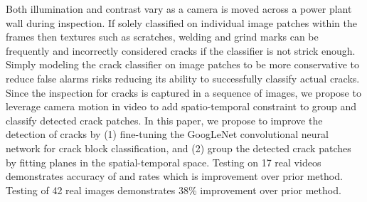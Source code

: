         Both illumination and contrast vary as a camera is moved across a power plant wall during inspection. If solely classified on individual image patches within the frames then textures such as scratches, welding and grind marks can be frequently and incorrectly considered cracks if the classifier is not strick enough.
        Simply modeling the crack classifier on image patches to be more conservative to reduce false alarms risks reducing its ability to successfully classify actual cracks. 
        Since the inspection for cracks is captured in a sequence of images, we propose to leverage camera motion in video to add spatio-temporal constraint to group and classify detected crack patches. 
        In this paper, we propose to improve the detection of cracks by (1) fine-tuning the GoogLeNet convolutional neural network for crack block classification, and (2) group the detected crack patches by fitting planes in the spatial-temporal space.
        Testing on 17 real videos demonstrates accuracy of  and  rates which is \comment{[XX]\%} improvement over prior method. Testing of 42 real images demonstrates 38\% improvement over prior method. %